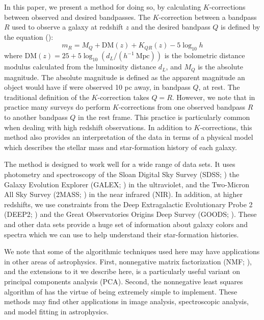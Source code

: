 \documentclass[12pt,preprint]{aastex}
\begin{document}
In this paper, we present a method for doing so, by calculating
$K$-corrections between observed and desired bandpasses.  The
$K$-correction between a bandpass $R$ used to observe a galaxy at
redshift $z$ and the desired bandpass $Q$ is defined by the equation
(\citealt{oke68a, hogg02a}):
\begin{equation}
m_R = M_Q + \mathrm{DM}(z) + K_{QR}(z) - 5 \log_{10} h 
\end{equation}
where $\mathrm{DM}(z) = 25 + 5\log_{10} (d_L / (h^{-1}{\mathrm{~Mpc}}))$ is the
bolometric distance modulus calculated from the luminosity distance
$d_L$, and $M_Q$ is the absolute magnitude. The absolute magnitude is
defined as the apparent magnitude an object would have if were
observed 10 pc away, in bandpass $Q$, at rest.  The traditional
definition of the $K$-correction takes $Q=R$. However, we note that in
practice many surveys do perform $K$-corrections from one observed
bandpass $R$ to another bandpass $Q$ in the rest frame. This practice
is particularly common when dealing with high redshift observations.
In addition to $K$-corrections, this method also provides an
interpretation of the data in terms of a physical model which
describes the stellar mass and star-formation history of each galaxy.

The method is designed to work well for a wide range of data sets.  It
uses photometry and spectroscopy of the Sloan Digital Sky Survey
(SDSS; \citealt{york00a}) the Galaxy Evolution Explorer (GALEX;
\citealt{martin05a}) in the ultraviolet, and the Two-Micron All Sky
Survey (2MASS; \citealt{skrutskie97a}) in the near infrared (NIR). In
addition, at higher redshifts, we use constraints from the Deep
Extragalactic Evolutionary Probe 2 (DEEP2; \citealt{davis03a,
faber03a}) and the Great Observatories Origins Deep Survey (GOODS;
\citealt{giavalisco04a}).  These and other data sets provide a huge
set of information about galaxy colors and spectra which we can use to
help understand their star-formation histories.

We note that some of the algorithmic techniques used here may have
applications in other areas of astrophysics. First, nonnegative matrix
factorization (NMF; \citealt{lee00a}), and the extensions to it we
describe here, is a particularly useful variant on principal
components
analysis (PCA). Second, the nonnegative least squares algorithm of
\citet{sha02a} has the virtue of being extremely simple to implement.
These methods may find other applications in image analysis, spectroscopic
analysis, and model fitting in astrophysics.
\end{document}
